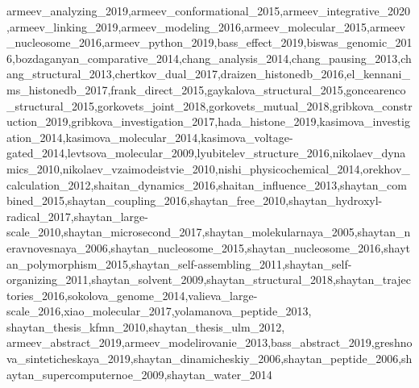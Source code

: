 {\begin{refsection}
{          armeev_analyzing_2019,armeev_conformational_2015,armeev_integrative_2020,armeev_linking_2019,armeev_modeling_2016,armeev_molecular_2015,armeev_nucleosome_2016,armeev_python_2019,bass_effect_2019,biswas_genomic_2016,bozdaganyan_comparative_2014,chang_analysis_2014,chang_pausing_2013,chang_structural_2013,chertkov_dual_2017,draizen_histonedb_2016,el_kennani_ms_histonedb_2017,frank_direct_2015,gaykalova_structural_2015,goncearenco_structural_2015,gorkovets_joint_2018,gorkovets_mutual_2018,gribkova_construction_2019,gribkova_investigation_2017,hada_histone_2019,kasimova_investigation_2014,kasimova_molecular_2014,kasimova_voltage-gated_2014,levtsova_molecular_2009,lyubitelev_structure_2016,nikolaev_dynamics_2010,nikolaev_vzaimodeistvie_2010,nishi_physicochemical_2014,orekhov_calculation_2012,shaitan_dynamics_2016,shaitan_influence_2013,shaytan_combined_2015,shaytan_coupling_2016,shaytan_free_2010,shaytan_hydroxyl-radical_2017,shaytan_large-scale_2010,shaytan_microsecond_2017,shaytan_molekularnaya_2005,shaytan_neravnovesnaya_2006,shaytan_nucleosome_2015,shaytan_nucleosome_2016,shaytan_polymorphism_2015,shaytan_self-assembling_2011,shaytan_self-organizing_2011,shaytan_solvent_2009,shaytan_structural_2018,shaytan_trajectories_2016,sokolova_genome_2014,valieva_large-scale_2016,xiao_molecular_2017,yolamanova_peptide_2013,%
          shaytan_thesis_kfmn_2010,shaytan_thesis_ulm_2012,%
          armeev_abstract_2019,armeev_modelirovanie_2013,bass_abstract_2019,greshnova_sinteticheskaya_2019,shaytan_dinamicheskiy_2006,shaytan_peptide_2006,shaytan_supercomputernoe_2009,shaytan_water_2014}
    \end{refsection}%
}


